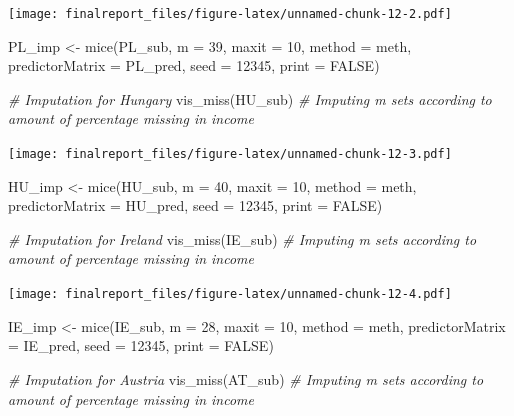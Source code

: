 \documentclass[
]{article}
\newenvironment{Shaded}{\begin{snugshade}}{\end{snugshade}}
\newcommand{\AttributeTok}[1]{\textcolor[rgb]{0.77,0.63,0.00}{#1}}
\newcommand{\CommentTok}[1]{\textcolor[rgb]{0.56,0.35,0.01}{\textit{#1}}}
\newcommand{\ConstantTok}[1]{\textcolor[rgb]{0.00,0.00,0.00}{#1}}
\newcommand{\DecValTok}[1]{\textcolor[rgb]{0.00,0.00,0.81}{#1}}
\newcommand{\FunctionTok}[1]{\textcolor[rgb]{0.00,0.00,0.00}{#1}}
\newcommand{\NormalTok}[1]{#1}
\newcommand{\OtherTok}[1]{\textcolor[rgb]{0.56,0.35,0.01}{#1}}
\begin{document}
\texttt{[image: finalreport\_files/figure-latex/unnamed-chunk-12-2.pdf]}

\begin{Shaded}
\begin{Highlighting}[]
\NormalTok{PL\_imp }\OtherTok{\textless{}{-}} \FunctionTok{mice}\NormalTok{(PL\_sub,}
               \AttributeTok{m =} \DecValTok{39}\NormalTok{,}
               \AttributeTok{maxit =} \DecValTok{10}\NormalTok{, }
               \AttributeTok{method =}\NormalTok{ meth,}
               \AttributeTok{predictorMatrix =}\NormalTok{ PL\_pred,}
               \AttributeTok{seed =} \DecValTok{12345}\NormalTok{,}
               \AttributeTok{print =} \ConstantTok{FALSE}\NormalTok{)}

\CommentTok{\# Imputation for Hungary}
\FunctionTok{vis\_miss}\NormalTok{(HU\_sub) }\CommentTok{\# Imputing m sets according to amount of percentage missing in income}
\end{Highlighting}
\end{Shaded}

\texttt{[image: finalreport\_files/figure-latex/unnamed-chunk-12-3.pdf]}

\begin{Shaded}
\begin{Highlighting}[]
\NormalTok{HU\_imp }\OtherTok{\textless{}{-}} \FunctionTok{mice}\NormalTok{(HU\_sub,}
               \AttributeTok{m =} \DecValTok{40}\NormalTok{,}
               \AttributeTok{maxit =} \DecValTok{10}\NormalTok{, }
               \AttributeTok{method =}\NormalTok{ meth,}
               \AttributeTok{predictorMatrix =}\NormalTok{ HU\_pred,}
               \AttributeTok{seed =} \DecValTok{12345}\NormalTok{,}
               \AttributeTok{print =} \ConstantTok{FALSE}\NormalTok{)}

\CommentTok{\# Imputation for Ireland}
\FunctionTok{vis\_miss}\NormalTok{(IE\_sub) }\CommentTok{\# Imputing m sets according to amount of percentage missing in income}
\end{Highlighting}
\end{Shaded}

\texttt{[image: finalreport\_files/figure-latex/unnamed-chunk-12-4.pdf]}

\begin{Shaded}
\begin{Highlighting}[]
\NormalTok{IE\_imp }\OtherTok{\textless{}{-}} \FunctionTok{mice}\NormalTok{(IE\_sub,}
               \AttributeTok{m =} \DecValTok{28}\NormalTok{,}
               \AttributeTok{maxit =} \DecValTok{10}\NormalTok{, }
               \AttributeTok{method =}\NormalTok{ meth,}
               \AttributeTok{predictorMatrix =}\NormalTok{ IE\_pred,}
               \AttributeTok{seed =} \DecValTok{12345}\NormalTok{,}
               \AttributeTok{print =} \ConstantTok{FALSE}\NormalTok{)}

\CommentTok{\# Imputation for Austria}
\FunctionTok{vis\_miss}\NormalTok{(AT\_sub) }\CommentTok{\# Imputing m sets according to amount of percentage missing in income}
\end{Highlighting}
\end{Shaded}
\end{document}
